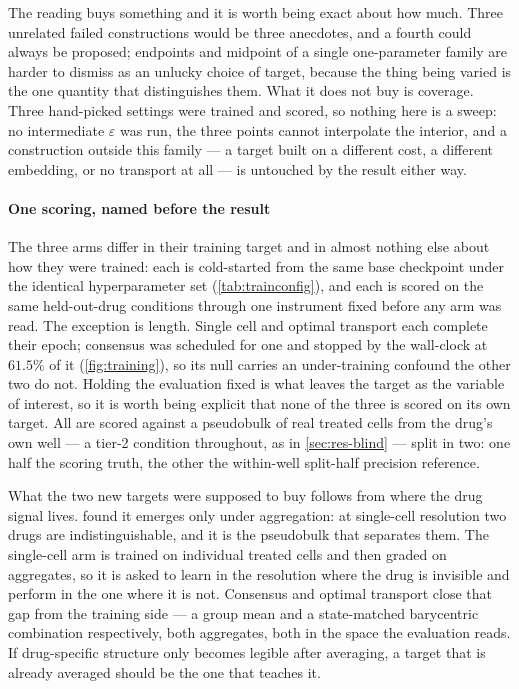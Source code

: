 The reading buys something and it is worth being exact about how much. Three
unrelated failed constructions would be three anecdotes, and a fourth could always
be proposed; endpoints and midpoint of a single one-parameter family are harder to
dismiss as an unlucky choice of target, because the thing being varied is the one
quantity that distinguishes them. What it does not buy is coverage. Three
hand-picked settings were trained and scored, so nothing here is a sweep: no
intermediate $\varepsilon$ was run, the three points cannot interpolate the
interior, and a construction outside this family --- a target built on a different
cost, a different embedding, or no transport at all --- is untouched by the result
either way.

\paragraph{One scoring, named before the result} The three arms differ in their
training target and in almost nothing else about how they were trained: each is
cold-started from the same base checkpoint under the identical hyperparameter set
(\cref{tab:trainconfig}), and each is scored on the same held-out-drug conditions
through one instrument fixed before any arm was read. The exception is length.
Single cell and optimal transport each complete their epoch; consensus was
scheduled for one and stopped by the wall-clock at $61.5\%$ of it
(\cref{fig:training}), so its null carries an under-training confound the other
two do not. Holding the evaluation
fixed is what leaves the target as the variable of interest, so it is worth being
explicit that none of the three is scored on its own target. All are scored against a pseudobulk of real treated cells from the drug's own well — a tier-2 condition throughout, as in \cref{sec:res-blind} — split in two: one half the scoring truth, the other the within-well split-half precision reference.



What the two new targets were supposed to buy follows from where the drug signal
lives.  found it emerges only under aggregation: at
single-cell resolution two drugs are indistinguishable, and it is the pseudobulk
that separates them. The single-cell arm is trained on individual treated cells
and then graded on aggregates, so it is asked to learn in the resolution where
the drug is invisible and perform in the one where it is not. Consensus and
optimal transport close that gap from the training side --- a group mean and a
state-matched barycentric combination respectively, both aggregates, both in the
space the evaluation reads. If drug-specific structure only becomes legible after
averaging, a target that is already averaged should be the one that teaches it.

